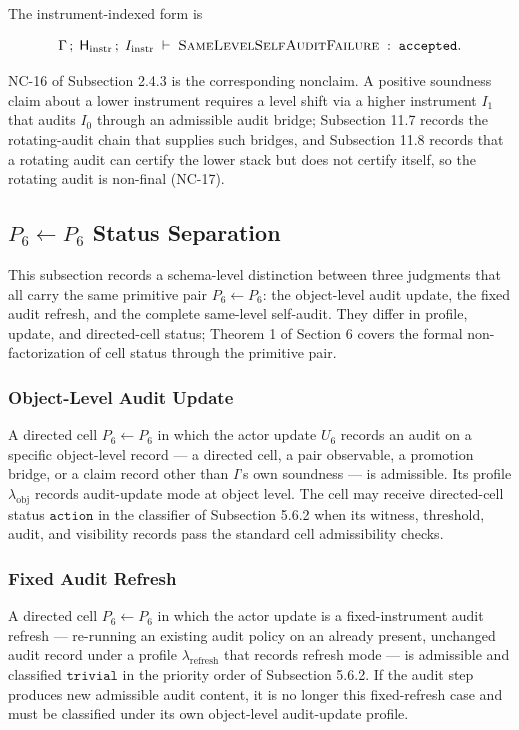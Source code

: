 \documentclass[11pt]{article}
\theoremstyle{definition}
\begin{document}
The instrument-indexed form is

\[
\Gamma\,;\;\mathsf H_{\mathrm{instr}}\,;\;I_{\mathrm{instr}}\;\vdash\;\textsc{SameLevelSelfAuditFailure}\;:\;\texttt{accepted}.
\]

NC-16 of Subsection 2.4.3 is the corresponding nonclaim. A positive soundness claim about a lower instrument requires a level shift via a higher instrument \(I_1\) that audits \(I_0\) through an admissible audit bridge; Subsection 11.7 records the rotating-audit chain that supplies such bridges, and Subsection 11.8 records that a rotating audit can certify the lower stack but does not certify itself, so the rotating audit is non-final (NC-17).

\subsection{\texorpdfstring{\(P_6\leftarrow P_6\) Status Separation}{P\_6\textbackslash leftarrow P\_6 Status Separation}}

This subsection records a schema-level distinction between three judgments that all carry the same primitive pair \(P_6\leftarrow P_6\): the object-level audit update, the fixed audit refresh, and the complete same-level self-audit. They differ in profile, update, and directed-cell status; Theorem 1 of Section 6 covers the formal non-factorization of cell status through the primitive pair.

\subsubsection{Object-Level Audit Update}

A directed cell \(P_6\leftarrow P_6\) in which the actor update \(U_6\) records an audit on a specific object-level record --- a directed cell, a pair observable, a promotion bridge, or a claim record other than \(I\)'s own soundness --- is admissible. Its profile \(\lambda_{\mathrm{obj}}\) records audit-update mode at object level. The cell may receive directed-cell status \(\texttt{action}\) in the classifier of Subsection 5.6.2 when its witness, threshold, audit, and visibility records pass the standard cell admissibility checks.

\subsubsection{Fixed Audit Refresh}

A directed cell \(P_6\leftarrow P_6\) in which the actor update is a fixed-instrument audit refresh --- re-running an existing audit policy on an already present, unchanged audit record under a profile \(\lambda_{\mathrm{refresh}}\) that records refresh mode --- is admissible and classified \(\texttt{trivial}\) in the priority order of Subsection 5.6.2. If the audit step produces new admissible audit content, it is no longer this fixed-refresh case and must be classified under its own object-level audit-update profile.
\end{document}
